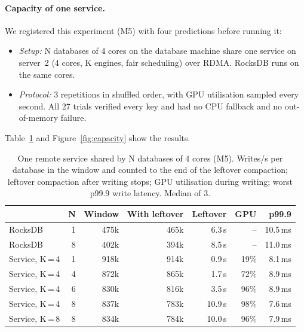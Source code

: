 \documentclass[sigconf, nonacm]{acmart}
\begin{document}
\paragraph{Capacity of one service.} We registered this experiment (M5) with four
predictions before running it:
\begin{itemize}
  \item \emph{Setup:} N databases of 4 cores on the database machine share one service on
        server~2 (4 cores, K engines, fair scheduling) over RDMA. RocksDB runs on the same
        cores.
  \item \emph{Protocol:} 3 repetitions in shuffled order, with GPU utilisation sampled every
        second. All 27 trials verified every key and had no CPU fallback and no out-of-memory
        failure.
\end{itemize}
Table~\ref{tab:capacity} and Figure~\ref{fig:capacity} show the results.

\begin{table}[t]
  \caption{One remote service shared by N databases of 4 cores (M5). Writes/s per database in
  the window and counted to the end of the leftover compaction; leftover compaction after
  writing stops; GPU utilisation during writing; worst p99.9 write latency. Median of 3.}
  \label{tab:capacity}
  \small
  \setlength{\tabcolsep}{3.5pt}
  \begin{tabular}{lrrrrrr}
    \toprule
     & N & Window & With leftover & Leftover & GPU & p99.9 \\
    \midrule
    RocksDB        & 1 & 475k & 465k & 6.3\,s & -- & 10.5\,ms \\
    RocksDB        & 8 & 402k & 394k & 8.5\,s & -- & 11.0\,ms \\
    Service, K\,=\,4 & 1 & 918k & 914k & 0.9\,s & 19\% & 8.1\,ms \\
    Service, K\,=\,4 & 4 & 872k & 865k & 1.7\,s & 72\% & 8.9\,ms \\
    Service, K\,=\,4 & 6 & 830k & 816k & 3.5\,s & 96\% & 8.9\,ms \\
    Service, K\,=\,4 & 8 & 837k & 783k & 10.9\,s & 98\% & 7.6\,ms \\
    Service, K\,=\,8 & 8 & 834k & 784k & 10.0\,s & 96\% & 7.9\,ms \\
    \bottomrule
  \end{tabular}
\end{table}
\end{document}
